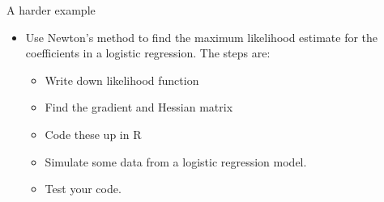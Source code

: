 \documentclass[10pt]{beamer}
\begin{document}
                                                                                              \begin{frame}{A harder example}
                                                                                                \begin{itemize}
                                                                                                \item Use Newton's method to find the maximum likelihood estimate for the coefficients in a logistic regression. The steps are:
                                                                                                  \begin{itemize}
                                                                                                  \item Write down likelihood function
                                                                                                  \item Find the gradient and Hessian matrix
                                                                                                  \item Code these up in R
                                                                                                  \item Simulate some data from a logistic regression model.
                                                                                                  \item Test your code.
                                                                                                  \end{itemize}
                                                                                                \end{itemize}
                                                                                              \end{frame}
\end{document}
